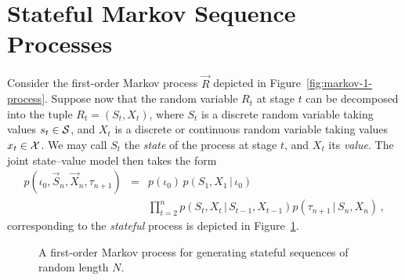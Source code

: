 \documentclass[a4paper]{article}
\begin{document}
\section{Stateful Markov Sequence Processes}
Consider the first-order Markov process $\vec{R}$ depicted in Figure~\ref{fig:markov-1-process}.
Suppose now that the random variable $R_t$ at stage $t$ can be decomposed into the tuple
$R_t=(S_t,X_t)$, where $S_t$ is a discrete random variable taking values $s_t\in{\cal S}$, and $X_t$
is a discrete or continuous random variable taking values $x_t\in{\cal X}$.
We may call $S_t$ the {\em state} of the process at stage $t$, and $X_t$ its {\em value}.
The joint state--value model then takes the form 
\begin{eqnarray}
p(\iota_0,\vec{S}_n,\vec{X}_n,\tau_{n+1}) & = & 
p(\iota_0)\,p(S_1,X_1\,|\,\iota_0)
\nonumber\\&&
\prod_{t=2}^{n}p(S_t,X_t\,|\,S_{t-1},X_{t-1})
p(\tau_{n+1}\,|\,S_n,X_n)
\,,
\end{eqnarray}
corresponding to the {\em stateful} process is depicted in Figure~\ref{fig:stateful-1-process}.
\begin{figure}[hbt]
\centering
{}
\caption{A first-order Markov process for generating stateful sequences of random length $N$.}
\label{fig:stateful-1-process}
\end{figure}
\end{document}
